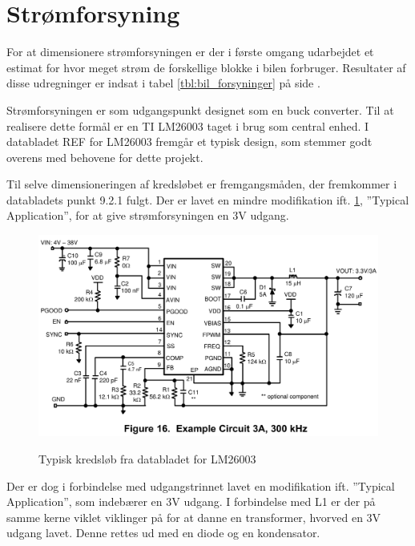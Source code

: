 \section{Strømforsyning}

For at dimensionere strømforsyningen er der i første omgang udarbejdet et estimat for hvor meget strøm de forskellige blokke i bilen forbruger. 
Resultater af disse udregninger er indsat i tabel \ref{tbl:bil_forsyninger} på side \pageref{tbl:bil_forsyninger}.

Strømforsyningen er som udgangspunkt designet som en buck converter.%
Til at realisere dette formål er en TI LM26003 taget i brug som central enhed.
I databladet REF for LM26003 fremgår et typisk design, som stemmer godt overens med behovene for dette projekt.

Til selve dimensioneringen af kredsløbet er fremgangsmåden, der fremkommer i databladets punkt 9.2.1 fulgt. Der er lavet en mindre modifikation ift. \ref{fig:lm26003fig16}, ''Typical Application'', for at give strømforsyningen en 3V udgang.

\begin{figure}[h]
\centering
\includegraphics[width=\textwidth* 9/10]{../fig/billeder/lm26003fig16}
\label{fig:lm26003fig16}
\caption{Typisk kredsløb fra databladet for LM26003}
\end{figure}

Der er dog i forbindelse med udgangstrinnet lavet en modifikation ift. ''Typical Application'', som indebærer en 3V udgang. I forbindelse med L1 er der på samme kerne viklet viklinger på for at danne en transformer, hvorved en 3V udgang lavet. Denne rettes ud med en diode og en kondensator. 

